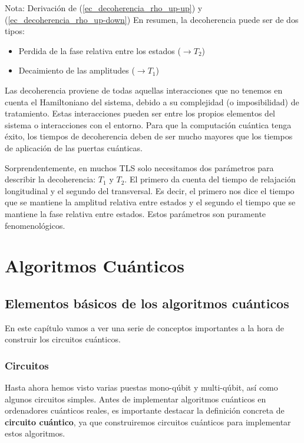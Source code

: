 \documentclass[a4paper,11pt]{book} %
\numberwithin{equation}{chapter}
\begin{document}
\begin{mybox_blue}{Nota: Derivación de (\ref{ec_decoherencia_rho_up-up}) y  (\ref{ec_decoherencia_rho_up-down})}
En resumen, la decoherencia puede ser de dos tipos:
\begin{itemize}
	\item Perdida de la fase relativa entre los estados ($\rightarrow T_2$)
	\item Decaimiento de las amplitudes ($\rightarrow T_1$)
\end{itemize}
Las decoherencia proviene de todas aquellas interacciones que no tenemos en cuenta el Hamiltoniano del sistema, debido a su complejidad (o imposibilidad) de tratamiento. Estas interacciones pueden ser entre los propios elementos del sistema o interacciones con el entorno. Para que la computación cuántica tenga éxito, los tiempos de decoherencia deben de ser mucho mayores que los tiempos de aplicación de las puertas cuánticas. 

Sorprendentemente, en muchos TLS solo necesitamos dos parámetros para describir la decoherencia: $T_1$ y $T_2$. El primero da cuenta del tiempo de relajación longitudinal y el segundo del transversal. Es decir, el primero nos dice el tiempo que se mantiene la amplitud relativa entre estados y el segundo el tiempo que se mantiene la fase relativa entre estados. Estos parámetros son puramente fenomenológicos.








	
	

\part{Algoritmos Cuánticos} \label{part_algoritmos}

\chapter{Elementos básicos de los algoritmos cuánticos}

En este capítulo vamos a ver una serie de conceptos importantes a la hora de construir los circuitos cuánticos.

	\section{Circuitos}
	
Hasta ahora hemos visto varias puestas mono-qúbit y multi-qúbit, así como algunos circuitos simples. 
Antes de implementar algoritmos cuánticos en ordenadores cuánticos reales, es importante destacar la definición concreta de \textbf{circuito cuántico}, ya que construiremos circuitos cuánticos para implementar estos algoritmos.


\end{mybox_blue}
\end{document}
